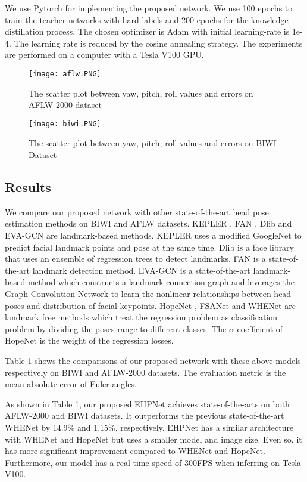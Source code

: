 \documentclass[a4paper,twoside]{article}
\begin{document}
We use Pytorch for implementing the proposed network. We use 100 epochs to train the teacher networks with hard labels and 200 epochs for the knowledge distillation process. The chosen optimizer is Adam with initial learning-rate is 1e-4. The learning rate is reduced by the cosine annealing strategy. The experiments are performed on a computer with a Tesla V100 GPU.
\begin{figure*}[htbp]
    \centering
    \texttt{[image: aflw.PNG]}
    \caption{The scatter plot between yaw, pitch, roll values and errors on AFLW-2000 dataset}
    \label{fig:galaxy}
\end{figure*}
\begin{figure*}[htbp]
    \centering
    \texttt{[image: biwi.PNG]}
    \caption{The scatter plot between yaw, pitch, roll values and errors on BIWI Dataset}
    \label{fig:galaxy}
\end{figure*}
\subsection{Results}

We compare our proposed network with other state-of-the-art head pose estimation methods on BIWI and AFLW datasets. KEPLER \cite{kumar2017kepler}, FAN \cite{bulat2017far}, Dlib \cite{kazemi2014one} and EVA-GCN \cite{xin2021eva} are landmark-based methods. KEPLER \cite{kumar2017kepler} uses a modified GoogleNet to predict facial landmark points and pose at the same time. Dlib \cite{kazemi2014one} is a face library that uses an ensemble of regression trees to detect landmarks. FAN \cite{bulat2017far} is a state-of-the-art landmark detection method. EVA-GCN \cite{xin2021eva} is a state-of-the-art landmark-based method which constructs a landmark-connection graph and leverages the Graph Convolution Network \cite{yan2018spatial} to learn the nonlinear relationships between head poses and distribution of facial keypoints. HopeNet \cite{ruiz2018fine}, FSANet \cite{yang2019fsa} and WHENet \cite{zhou2020whenet} are landmark free methods which treat the regression problem as classification problem by dividing the poses range to different classes. The $\alpha$ coefficient of HopeNet is the weight of the regression losses. 

Table 1 shows the comparisons of our proposed network with these above models respectively on BIWI and AFLW-2000 datasets. The evaluation metric is the mean absolute error of Euler angles. 

As shown in Table 1, our proposed EHPNet achieves state-of-the-arts on both AFLW-2000 and BIWI datasets. It outperforms the previous state-of-the-art WHENet by 14.9\% and 1.15\%, respectively. EHPNet has a similar architecture with WHENet and HopeNet but uses a smaller model and image size. Even so, it has more significant improvement compared to WHENet and HopeNet. Furthermore, our model has a real-time speed of 300FPS when inferring on Tesla V100.
\end{document}
